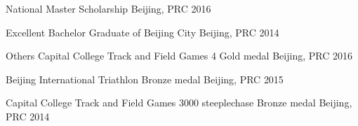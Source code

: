 \begin{cvhonors}
\cvhonor
{} %
{National Master Scholarship} %
{Beijing, PRC} %
{2016} %

\cvhonor
{} %
{Excellent Bachelor Graduate of Beijing City} %
{Beijing, PRC} %
{2014} %


\cvhonor
{Others} %
{Capital College Track and Field Games 4 Gold medal} %
{Beijing, PRC} %
{2016} %

\cvhonor
{} %
{Beijing International Triathlon Bronze medal} %
{Beijing, PRC} %
{2015} %

\cvhonor
{} %
{Capital College Track and Field Games 3000 steeplechase Bronze medal} %
{Beijing, PRC} %
{2014} %


\end{cvhonors}
